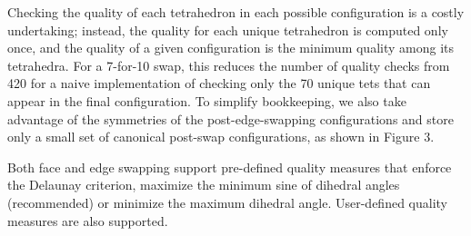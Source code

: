 Checking the quality of each tetrahedron in each possible configuration is a costly undertaking; instead, the quality for each unique tetrahedron is computed only once, and the quality of a given configuration is the minimum quality among its tetrahedra. For a 7-\/for-\/10 swap, this reduces the number of quality checks from 420 for a naive implementation of checking only the 70 unique tets that can appear in the final configuration. To simplify bookkeeping, we also take advantage of the symmetries of the post-\/edge-\/swapping configurations and store only a small set of canonical post-\/swap configurations, as shown in Figure 3.

 Both face and edge swapping support pre-\/defined quality measures that enforce the Delaunay criterion, maximize the minimum sine of dihedral angles (recommended) or minimize the maximum dihedral angle. User-\/defined quality measures are also supported. 